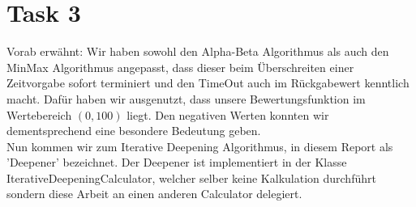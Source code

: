 \section{Task 3}
Vorab erwähnt: Wir haben sowohl den Alpha-Beta Algorithmus als auch den MinMax Algorithmus angepasst, dass dieser beim Überschreiten einer Zeitvorgabe sofort terminiert und den TimeOut auch im Rückgabewert kenntlich macht. Dafür haben wir ausgenutzt, dass unsere Bewertungsfunktion im Wertebereich  $(0,100)$  liegt. Den negativen Werten konnten wir dementsprechend eine besondere Bedeutung geben.\\
Nun kommen wir zum Iterative Deepening Algorithmus, in diesem Report als 'Deepener' bezeichnet.
Der Deepener ist implementiert in der Klasse IterativeDeepeningCalculator, welcher selber keine Kalkulation durchführt sondern diese Arbeit an einen anderen Calculator delegiert.

